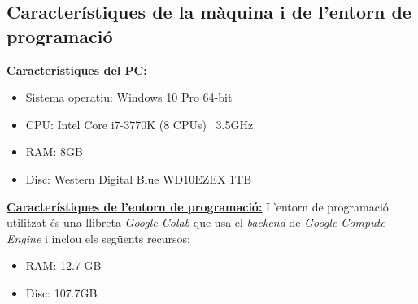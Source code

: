 \documentclass[a4paper,12pt]{report}
\begin{document}
\subsection*{Característiques de la màquina i de l'entorn de programació}
\textbf{\underline{Característiques del PC:}}
\begin{itemize}
    \item Sistema operatiu: Windows 10 Pro 64-bit
    \item CPU: Intel Core i7-3770K (8 CPUs) ~3.5GHz
    \item RAM: 8GB
    \item Disc: Western Digital Blue WD10EZEX 1TB
\end{itemize}
\textbf{\underline{Característiques de l'entorn de programació:}}
L'entorn de programació utilitzat és una llibreta \textit{Google Colab} que usa el \textit{backend} de \textit{Google Compute Engine} i inclou els següents recursos:
\begin{itemize}
    \item RAM: 12.7 GB
    \item Disc: 107.7GB
\end{itemize}
\end{document}

